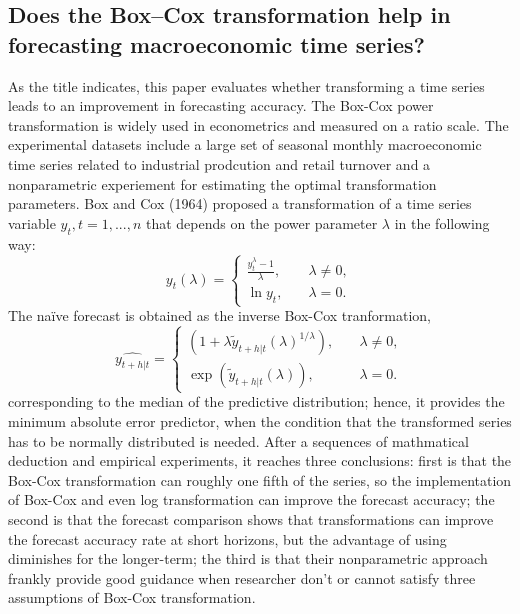 \documentclass[12pt]{article}
\begin{document}
\subsection{Does the Box–Cox transformation help in forecasting macroeconomic time series? }
As the title indicates, this paper evaluates whether transforming a time series leads to an improvement in forecasting accuracy. The Box-Cox power transformation is widely used in econometrics and measured on a ratio scale. The experimental datasets include a large set of seasonal monthly macroeconomic time series related to industrial prodcution and retail turnover and a nonparametric experiement for estimating the optimal transformation parameters. Box and Cox (1964) proposed a transformation of a time series variable $y_t, t = 1, ..., n$ that depends on the power parameter $\lambda$ in the following way: 
$$
y_t(\lambda) = 
  \begin{cases}
    \frac{y_t^{\lambda} - 1}{\lambda}, &\quad \lambda \neq 0, \\ 
    \ln{y_t}, &\quad \lambda = 0. 
  \end{cases}
$$
The naïve forecast is obtained as the inverse Box-Cox tranformation, 
$$
\hat{y_{t+h|t}} = 
  \begin{cases}
    (1+\lambda \tilde{y}_{t+h|t}(\lambda)^{1/\lambda}), &\quad \lambda \neq 0, \\
    \exp(\tilde{y}_{t+h|t}(\lambda)), &\quad \lambda = 0. 
  \end{cases} 
$$
corresponding to the median of the predictive distribution; hence, it provides the minimum absolute error predictor, when the condition that the transformed series has to be normally distributed is needed. After a sequences of mathmatical deduction and empirical experiments, it reaches three conclusions: first is that the Box-Cox transformation can roughly one fifth of the series, so the implementation of Box-Cox and even log transformation can improve the forecast accuracy; the second is that the forecast comparison shows that transformations can improve the forecast accuracy rate at short horizons, but the advantage of using diminishes for the longer-term; the third is that their nonparametric approach frankly provide good guidance when researcher don't or cannot satisfy three assumptions of Box-Cox transformation. 
\end{document}
